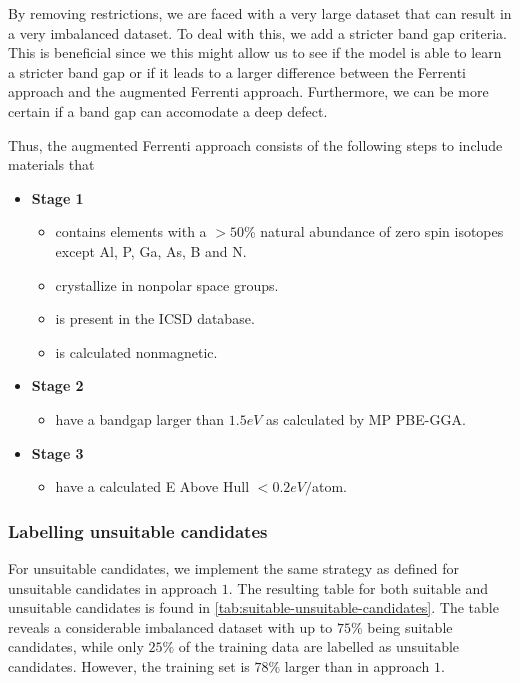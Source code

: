 By removing restrictions, we are faced with a very large dataset that can result in a very imbalanced dataset. To deal with this, we add a stricter band gap criteria. This is beneficial since we this might allow us to see if the model is able to learn a stricter band gap or if it leads to a larger difference between the Ferrenti approach and the augmented Ferrenti approach. Furthermore, we can be more certain if a band gap can accomodate a deep defect. %

Thus, the augmented Ferrenti approach consists of the following steps to include materials that

\begin{itemize}
  \item[]{\textbf{Stage 1}}
  \begin{itemize}
  \item contains elements with a $>50\%$ natural abundance of zero spin isotopes except Al, P, Ga, As, B and N.
  \item crystallize in nonpolar space groups.
  \item is present in the ICSD database.
  \item is calculated nonmagnetic.
  \end{itemize}
  \item[]{\textbf{Stage 2}}
  \begin{itemize}
  \item have a bandgap larger than $1.5eV$ as calculated by MP PBE-GGA.
  \end{itemize}
  \item[]{\textbf{Stage 3}}
  \begin{itemize}
  \item have a calculated E Above Hull $<0.2eV/$atom.
  \end{itemize}
\end{itemize}

\subsubsection{Labelling unsuitable candidates}

For unsuitable candidates, we implement the same strategy as defined for unsuitable candidates in approach $1$. The resulting table for both suitable and unsuitable candidates is found in \autoref{tab:suitable-unsuitable-candidates}. The table reveals a considerable imbalanced dataset with up to $75 \%$ being suitable candidates, while only $25 \%$ of the training data are labelled as unsuitable candidates. However, the training set is $78 \%$ larger than in approach $1$.

